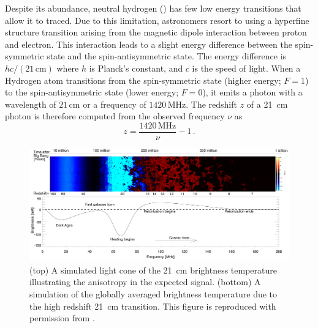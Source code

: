 \begin{bibunit}
Despite its abundance, neutral hydrogen () has few low energy transitions that allow it to
traced.  Due to this limitation, astronomers resort to using a hyperfine structure transition
arising from the magnetic dipole interaction between proton and electron. This interaction leads to
a slight energy difference between the spin-symmetric state and the spin-antisymmetric state. The
energy difference is $hc / (21\,\text{cm})$ where $h$ is Planck's constant, and $c$ is the speed of
light.  When a Hydrogen atom transitions from the spin-symmetric state (higher energy; $F=1$) to the
spin-antisymmetric state (lower energy; $F=0$), it emits a photon with a wavelength of
$21\,\text{cm}$ or a frequency of $1420\,\text{MHz}$. The redshift $z$ of a 21~cm photon is
therefore computed from the observed frequency $\nu$ as
\begin{equation}\label{eq:redshift-equation}
    z = \frac{1420\,\text{MHz}}{\nu} - 1\,.
\end{equation}

\begin{figure}[t]
    \centering
    \includegraphics[width=\textwidth]{figures/chapter1/pritchard-2012-global-signal}
    \caption{
        (top) A simulated light cone of the 21~cm brightness temperature illustrating the
        anisotropy in the expected signal.
        (bottom) A simulation of the globally averaged brightness temperature due to the high
        redshift 21~cm transition.
        This figure is reproduced with permission from \citet{2012RPPh...75h6901P}.
    }
    \label{fig:pritchard-global-signal}
\end{figure}


\end{bibunit}
